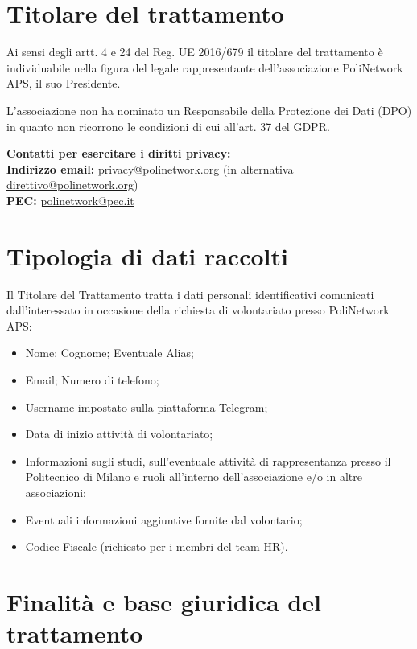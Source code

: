 \documentclass[legal]{polinetwork}
\begin{document}
\pnMakeHeader

\section{Titolare del trattamento}

Ai sensi degli artt. 4 e 24 del Reg. UE 2016/679 il titolare del trattamento è individuabile nella figura del legale rappresentante dell'associazione PoliNetwork APS, il suo Presidente.

L'associazione non ha nominato un Responsabile della Protezione dei Dati (DPO) in quanto non ricorrono le condizioni di cui all'art. 37 del GDPR.

\textbf{Contatti per esercitare i diritti privacy:} \\

\textbf{Indirizzo email:} \href{mailto:privacy@polinetwork.org}{privacy@polinetwork.org} (in alternativa \href{mailto:direttivo@polinetwork.org}{direttivo@polinetwork.org}) \\
\textbf{PEC:} \href{mailto:polinetwork@pec.it}{polinetwork@pec.it}

\section{Tipologia di dati raccolti}

Il Titolare del Trattamento tratta i dati personali identificativi comunicati dall'interessato in occasione della richiesta di volontariato presso PoliNetwork APS:

\begin{itemize}
	\item Nome; Cognome; Eventuale Alias;
	\item Email; Numero di telefono;
	\item Username impostato sulla piattaforma Telegram;
	\item Data di inizio attività di volontariato;
	\item Informazioni sugli studi, sull'eventuale attività di rappresentanza presso il Politecnico di Milano e ruoli all'interno dell'associazione e/o in altre associazioni;
	\item Eventuali informazioni aggiuntive fornite dal volontario;
	\item Codice Fiscale (richiesto per i membri del team HR).
\end{itemize}

\section{Finalità e base giuridica del trattamento}
\end{document}
